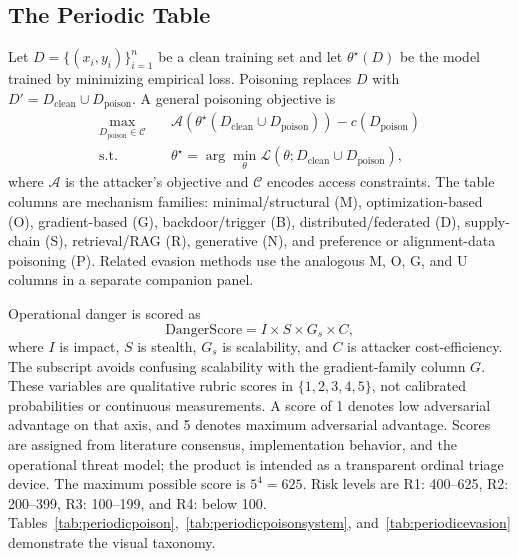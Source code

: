 \documentclass[conference]{IEEEtran}
\begin{document}


\subsection{The Periodic Table}

Let \(D=\{(x_i,y_i)\}_{i=1}^{n}\) be a clean training set and let \(\theta^\star(D)\) be the model trained by minimizing empirical loss. Poisoning replaces \(D\) with \(D'=D_{\mathrm{clean}}\cup D_{\mathrm{poison}}\). A general poisoning objective is
\begin{equation}
\begin{aligned}
 \max_{D_{\mathrm{poison}}\in\mathcal{C}}\quad
   & \mathcal{A}(\theta^\star(D_{\mathrm{clean}}\cup D_{\mathrm{poison}}))
   - c(D_{\mathrm{poison}})\\
 \text{s.t.}\quad
   & \theta^\star=\arg\min_{\theta}\mathcal{L}(\theta;D_{\mathrm{clean}}\cup D_{\mathrm{poison}}),
\end{aligned}
\end{equation}
where \(\mathcal{A}\) is the attacker's objective and \(\mathcal{C}\) encodes access constraints. The table columns are mechanism families: minimal/structural (M), optimization-based (O), gradient-based (G), backdoor/trigger (B), distributed/federated (D), supply-chain (S), retrieval/RAG (R), generative (N), and preference or alignment-data poisoning (P). Related evasion methods use the analogous M, O, G, and U columns in a separate companion panel.

Operational danger is scored as
\begin{equation}
\mathrm{DangerScore}=I\times S\times G_s\times C,
\end{equation}
where \(I\) is impact, \(S\) is stealth, \(G_s\) is scalability, and \(C\) is attacker cost-efficiency. The subscript avoids confusing scalability with the gradient-family column \(G\). These variables are qualitative rubric scores in \(\{1,2,3,4,5\}\), not calibrated probabilities or continuous measurements. A score of 1 denotes low adversarial advantage on that axis, and 5 denotes maximum adversarial advantage. Scores are assigned from literature consensus, implementation behavior, and the operational threat model; the product is intended as a transparent ordinal triage device. The maximum possible score is \(5^4=625\). Risk levels are R1: 400--625, R2: 200--399, R3: 100--199, and R4: below 100. Tables~\ref{tab:periodicpoison},~\ref{tab:periodicpoisonsystem}, and~\ref{tab:periodicevasion} demonstrate the visual taxonomy.
\end{document}
